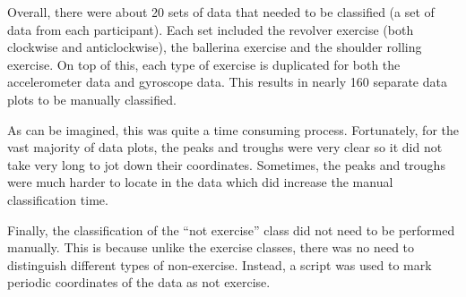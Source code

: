 Overall, there were about 20 sets of data that needed to be classified (a set of data from each participant). Each set included the revolver exercise (both clockwise and anticlockwise), the ballerina exercise and the shoulder rolling exercise. On top of this, each type of exercise is duplicated for both the accelerometer data and gyroscope data. This results in nearly 160 separate data plots to be manually classified.

As can be imagined, this was quite a time consuming process. Fortunately, for the vast majority of data plots, the peaks and troughs were very clear so it did not take very long to jot down their coordinates. Sometimes, the peaks and troughs were much harder to locate in the data which did increase the manual classification time.

Finally, the classification of the “not exercise” class did not need to be performed manually. This is because unlike the exercise classes, there was no need to distinguish different types of non-exercise. Instead, a script was used to mark periodic coordinates of the data as not exercise.
